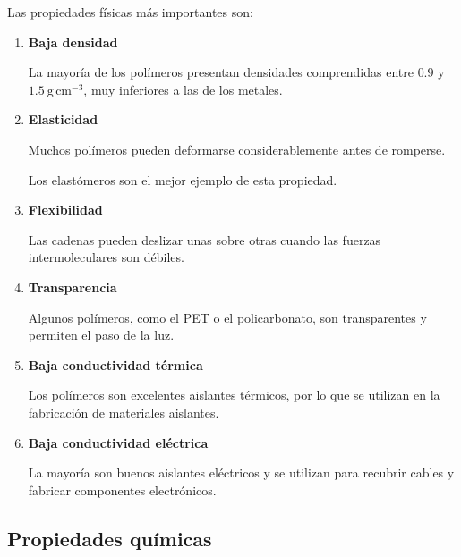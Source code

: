 Las propiedades físicas más importantes son:

\begin{enumerate}[label=\alph*)]

\item \textbf{Baja densidad}

La mayoría de los polímeros presentan densidades comprendidas entre
\(0.9\) y \(1.5\ \mathrm{g\,cm^{-3}}\), muy inferiores a las de los metales.

\vspace{0.2cm}

\item \textbf{Elasticidad}

Muchos polímeros pueden deformarse considerablemente antes de romperse.

Los elastómeros son el mejor ejemplo de esta propiedad.

\vspace{0.2cm}

\item \textbf{Flexibilidad}

Las cadenas pueden deslizar unas sobre otras cuando las fuerzas intermoleculares
son débiles.

\vspace{0.2cm}

\item \textbf{Transparencia}

Algunos polímeros, como el PET o el policarbonato, son transparentes y permiten
el paso de la luz.

\vspace{0.2cm}

\item \textbf{Baja conductividad térmica}

Los polímeros son excelentes aislantes térmicos, por lo que se utilizan en la
fabricación de materiales aislantes.

\vspace{0.2cm}

\item \textbf{Baja conductividad eléctrica}

La mayoría son buenos aislantes eléctricos y se utilizan para recubrir cables y
fabricar componentes electrónicos.

\end{enumerate}


\subsection{Propiedades químicas}

